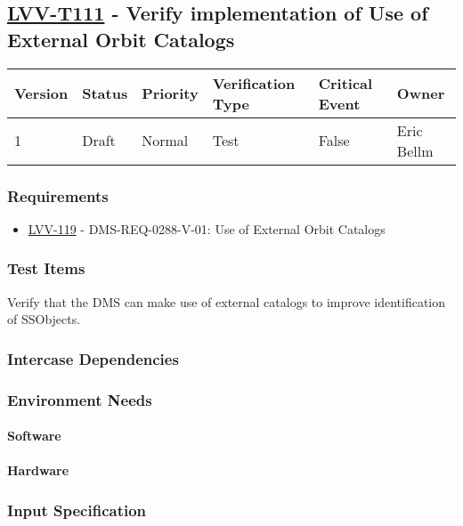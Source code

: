 \subsection{\href{https://jira.lsstcorp.org/secure/Tests.jspa\#/testCase/LVV-T111}{LVV-T111}
    - Verify implementation of Use of External Orbit Catalogs}\label{lvv-t111}

\begin{longtable}[]{llllll}
\toprule
Version & Status & Priority & Verification Type & Critical Event & Owner
\\\midrule
1 & Draft & Normal &
Test & False & Eric Bellm
\\\bottomrule
\end{longtable}

\subsubsection{Requirements}
\begin{itemize}
\item \href{https://jira.lsstcorp.org/browse/LVV-119}{LVV-119} - DMS-REQ-0288-V-01: Use of External Orbit Catalogs
\end{itemize}

\subsubsection{Test Items}
Verify that the DMS can make use of external catalogs to improve
identification of SSObjects.



\subsubsection{Intercase Dependencies}

\subsubsection{Environment Needs}

\paragraph{Software}

\paragraph{Hardware}

\subsubsection{Input Specification}

